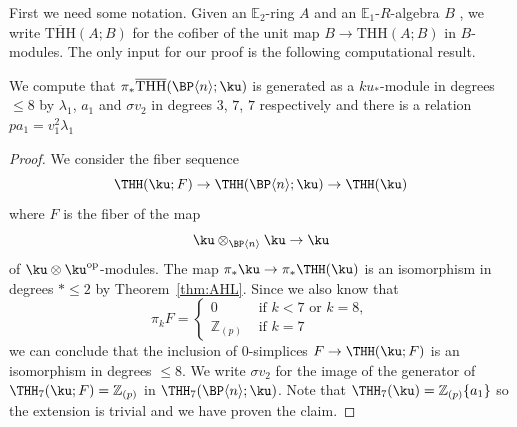 First we need some notation. Given an $\mathbb{E}_2$-ring $A$ and an $\mathbb{E}_1$-$R$-algebra $B$ , we write 
 $\overline{\mathrm{THH}}(A;B)$ for the cofiber of the unit map 
$B\to \mathrm{THH}(A;B)$ in $B$-modules. The only input for our proof is the following computational result. 

\begin{proposition}\label{prop-computational-input}
We compute that $\pi_*\overline{\mathrm{THH}}(\BP\langle n\rangle;\ku)$  is generated as a $ku_*$-module in degrees $\le 8$ by $\lambda_1$, $a_1$ and $\sigma v_2$ in degrees $3$, $7$, $7$ respectively and there is a relation $pa_1= v_1^2 \lambda_1$
\end{proposition}

\begin{proof}
We consider the fiber sequence  
\[ \THH(\ku;F) \to  \THH(\BP\langle n\rangle ; \ku )\to 
\THH(\ku) 
\]
where $F$ is the fiber of the map 
\[ \ku \otimes_{\BP\langle n \rangle }\ku \to \ku \]
of $\ku\otimes \ku^{\textup{op}}$-modules. 
The map $\pi_*\ku\to \pi_*\THH(\ku)$ is an isomorphism in degrees $*\le 2$ by Theorem~\ref{thm:AHL}. Since we also know that  
\[ 
\pi_k F = \begin{cases} 0 & \text{ if } k<7\text{ or } k = 8,\\
           \mathbb{Z}_{(p)} &\text{ if } k=7  
\end{cases}
\]
we can conclude that the inclusion of $0$-simplices $F\to \THH(\ku;F)$ is an isomorphism in degrees $\le 8$. We write $\sigma v_2$ for the image of the generator of $\THH_{7}(\ku;F)=\mathbb{Z}_{(p)}$ in $\THH_7(\BP\langle n\rangle ;\ku)$. Note that $\THH_7(\ku)=\mathbb{Z}_{(p)}\{a_1\}$ so the extension is trivial and we have proven the claim. 
\end{proof}

